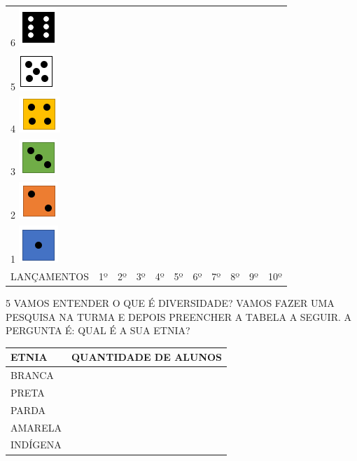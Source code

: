 \begin{longtable}[]{@{}lllllllllll@{}}
\toprule
6 \includegraphics[width=0.56258in,height=0.57300in]{media/image98.png}
& & & & & & & & & &\tabularnewline
5 \includegraphics[width=0.53132in,height=0.55216in]{media/image99.png}
& & & & & & & & & &\tabularnewline
4 \includegraphics[width=0.61467in,height=0.53132in]{media/image100.png}
& & & & & & & & & &\tabularnewline
3 \includegraphics[width=0.56258in,height=0.53132in]{media/image101.png}
& & & & & & & & & &\tabularnewline
2 \includegraphics[width=0.57300in,height=0.54174in]{media/image102.png}
& & & & & & & & & &\tabularnewline
1 \includegraphics[width=0.58341in,height=0.55216in]{media/image103.png}
& & & & & & & & & &\tabularnewline
LANÇAMENTOS & 1º & 2º & 3º & 4º & 5º & 6º & 7º & 8º & 9º &
10º\tabularnewline
\bottomrule
\end{longtable}


\num{5} VAMOS ENTENDER O QUE É DIVERSIDADE? VAMOS FAZER UMA PESQUISA NA TURMA E
DEPOIS PREENCHER A TABELA A SEGUIR. A PERGUNTA É: QUAL É A SUA ETNIA?

\begin{longtable}[]{@{}ll@{}}
\toprule
ETNIA & QUANTIDADE DE ALUNOS\tabularnewline
\midrule
\endhead
BRANCA &\tabularnewline
PRETA &\tabularnewline
PARDA &\tabularnewline
AMARELA &\tabularnewline
INDÍGENA &\tabularnewline
\bottomrule
\end{longtable}


